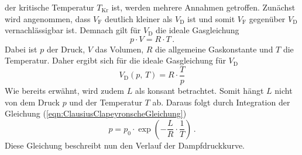 der kritische Temperatur $T_{\text{Kr}}$ ist, werden mehrere Annahmen getroffen. Zunächst wird angenommen, dass $V_{\text{F}}$ deutlich kleiner als $V_{\text{D}}$ ist und somit
$V_{\text{F}}$ gegenüber $V_{\text{D}}$ vernachlässigbar ist. Demnach gilt für $V_{\text{D}}$ die ideale Gasgleichung 
\begin{equation}
    p \cdot V = R \cdot T\,.
    \label{eqn:idealeGasgleichung}
\end{equation}
Dabei ist $p$ der Druck, $V$ das Volumen, $R$ die allgemeine Gaskonstante und $T$ die Temperatur. Daher ergibt sich für die ideale Gasgleichung für $V_{\text{D}}$ 
\begin{equation}
    V_{\text{D}} \left(p,\, T\right) = R\cdot \frac{T}{p}
    \label{eqn:idealeGasgleichung_V_D}
\end{equation}
Wie bereits erwähnt, wird zudem $L$ als konsant betrachtet. Somit hängt $L$ nicht von dem Druck $p$ und der Temperatur $T$ ab. Daraus folgt durch
Integration der Gleichung (\ref{eqn:ClausiusClapeyronscheGleichung})
\begin{equation}
    p = p_{0} \cdot \exp{\left(-\frac{L}{R}\cdot \frac{1}{T}\right)}\,.
    \label{eqn:Druck_p}
\end{equation}
Diese Gleichung beschreibt nun den Verlauf der Dampfdruckkurve.
